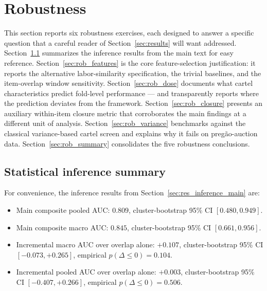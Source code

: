 \section{Robustness}\label{sec:robustness}

This section reports six robustness exercises, each designed to answer a specific question that a careful reader of Section~\ref{sec:results} will want addressed. Section~\ref{sec:rob_inference} summarizes the inference results from the main text for easy reference. Section~\ref{sec:rob_features} is the core feature-selection justification: it reports the alternative labor-similarity specification, the trivial baselines, and the item-overlap window sensitivity. Section~\ref{sec:rob_dose} documents what cartel characteristics predict fold-level performance --- and transparently reports where the prediction deviates from the framework. Section~\ref{sec:rob_closure} presents an auxiliary within-item closure metric that corroborates the main findings at a different unit of analysis. Section~\ref{sec:rob_variance} benchmarks against the classical variance-based cartel screen and explains why it fails on preg\~{a}o-auction data. Section~\ref{sec:rob_summary} consolidates the five robustness conclusions.

\subsection{Statistical inference summary}\label{sec:rob_inference}

For convenience, the inference results from Section~\ref{sec:res_inference_main} are:
\begin{itemize}
\item Main composite pooled AUC: $0.809$, cluster-bootstrap 95\% CI $[0.480, 0.949]$.
\item Main composite macro AUC: $0.845$, cluster-bootstrap 95\% CI $[0.661, 0.956]$.
\item Incremental macro AUC over overlap alone: $+0.107$, cluster-bootstrap 95\% CI $[-0.073, +0.265]$, empirical $p(\Delta \leq 0) = 0.104$.
\item Incremental pooled AUC over overlap alone: $+0.003$, cluster-bootstrap 95\% CI $[-0.407, +0.266]$, empirical $p(\Delta \leq 0) = 0.506$.
\end{itemize}

